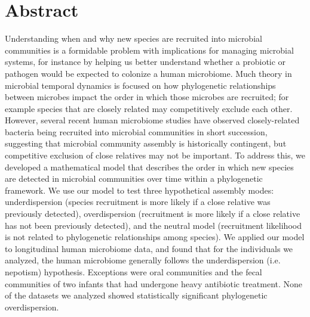 \documentclass{article}
\begin{document}
\newpage


{\parindent0pt \section{Abstract}}
Understanding when and why new species are recruited into microbial communities is a formidable problem with implications for managing microbial systems, for instance by helping us better understand whether a probiotic or pathogen would be expected to colonize a human microbiome. Much theory in microbial temporal dynamics is focused on how phylogenetic relationships between microbes impact the order in which those microbes are recruited; for example species that are closely related may competitively exclude each other. However, several recent human microbiome studies have observed closely-related bacteria being recruited into microbial communities in short succession, suggesting that microbial community assembly is historically contingent, but competitive exclusion of close relatives may not be important. To address this, we developed a mathematical model that describes the order in which new species are detected in microbial communities over time within a phylogenetic framework. We use our model to test three hypothetical assembly modes: underdispersion (species recruitment is more likely if a close relative was previously detected), overdispersion (recruitment is more likely if a close relative has not been previously detected), and the neutral model (recruitment likelihood is not related to phylogenetic relationships among species). We applied our model to longitudinal human microbiome data, and found that for the individuals we analyzed, the human microbiome generally follows the underdispersion (i.e. nepotism) hypothesis. Exceptions were oral communities  and the fecal communities of two infants that had undergone heavy antibiotic treatment. None of the datasets we analyzed showed statistically significant phylogenetic overdispersion.
\\\par
\end{document}
